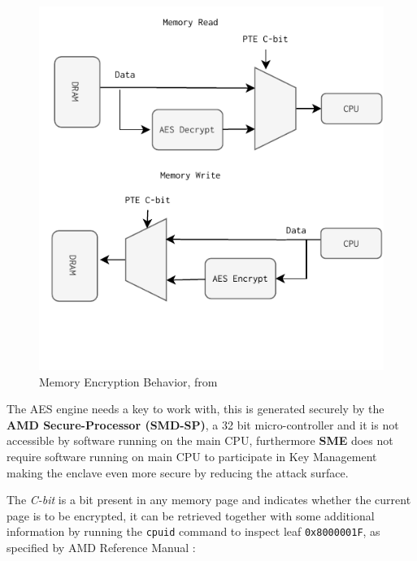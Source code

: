 \documentclass[twocolumn]{article}
\begin{document}
\begin{figure}
    \centering
    \includegraphics[scale=0.9]{img/read-write.pdf}
    \caption{Memory Encryption Behavior, from \cite{memory-encryption}}
    \label{fig:memory-encryption-fig}
\end{figure}

The AES engine needs a key to work with, this is generated securely by the \textbf{AMD Secure-Processor (SMD-SP)}, a 32 bit micro-controller and it is not accessible by software running on the main CPU, furthermore \textbf{SME} does not require software running on main CPU to participate in Key Management making the enclave even more secure by reducing the attack surface.

The \textit{C-bit} is a bit present in any memory page and indicates whether the current page is to be encrypted, it can be retrieved together with some additional information by running the \texttt{cpuid} command to inspect leaf \texttt{0x8000001F}, as specified by AMD Reference Manual \cite{architecture-reference}:
\end{document}
